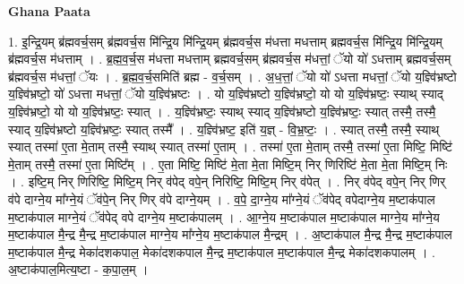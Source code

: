 \documentclass[17pt]{extarticle}
\begin{document}
\textbf{Ghana Paata } \newline

1. इ॒न्द्रि॒यम् ब्र॑ह्मवर्च॒सम् ब्र॑ह्मवर्च॒स मि॑न्द्रि॒य मि॑न्द्रि॒यम् ब्र॑ह्मवर्च॒स म॑धत्ता मधत्ताम् ब्रह्मवर्च॒स मि॑न्द्रि॒य मि॑न्द्रि॒यम् ब्र॑ह्मवर्च॒स म॑धत्ताम् । . ब्र॒ह्म॒व॒र्च॒स म॑धत्ता मधत्ताम् ब्रह्मवर्च॒सम् ब्र॑ह्मवर्च॒स म॑धत्तां॒ ॅयो यो॑ ऽधत्ताम् ब्रह्मवर्च॒सम् ब्र॑ह्मवर्च॒स म॑धत्तां॒ ॅयः । . ब्र॒ह्म॒व॒र्च॒समिति॑ ब्रह्म - व॒र्च॒सम् । . अ॒ध॒त्तां॒ ॅयो यो॑ ऽधत्ता मधत्तां॒ ॅयो य॒ज्ञ्वि॑भ्रष्टो य॒ज्ञ्वि॑भ्रष्टो॒ यो॑ ऽधत्ता मधत्तां॒ ॅयो य॒ज्ञ्वि॑भ्रष्टः । . यो य॒ज्ञ्वि॑भ्रष्टो य॒ज्ञ्वि॑भ्रष्टो॒ यो यो य॒ज्ञ्वि॑भ्रष्टः॒ स्याथ् स्याद् य॒ज्ञ्वि॑भ्रष्टो॒ यो यो य॒ज्ञ्वि॑भ्रष्टः॒ स्यात् । . य॒ज्ञ्वि॑भ्रष्टः॒ स्याथ् स्याद् य॒ज्ञ्वि॑भ्रष्टो य॒ज्ञ्वि॑भ्रष्टः॒ स्यात् तस्मै॒ तस्मै॒ स्याद् य॒ज्ञ्वि॑भ्रष्टो य॒ज्ञ्वि॑भ्रष्टः॒ स्यात् तस्मै᳚ । . य॒ज्ञ्वि॑भ्रष्ट॒ इति॑ य॒ज्ञ् - वि॒भ्र॒ष्टः॒ । . स्यात् तस्मै॒ तस्मै॒ स्याथ् स्यात् तस्मा॑ ए॒ता मे॒ताम् तस्मै॒ स्याथ् स्यात् तस्मा॑ ए॒ताम् । . तस्मा॑ ए॒ता मे॒ताम् तस्मै॒ तस्मा॑ ए॒ता मिष्टि॒ मिष्टि॑ मे॒ताम् तस्मै॒ तस्मा॑ ए॒ता मिष्टि᳚म् । . ए॒ता मिष्टि॒ मिष्टि॑ मे॒ता मे॒ता मिष्टि॒म् निर् णिरिष्टि॑ मे॒ता मे॒ता मिष्टि॒म् निः । . इष्टि॒म् निर् णिरिष्टि॒ मिष्टि॒म् निर् व॑पेद् वपे॒न् निरिष्टि॒ मिष्टि॒म् निर् व॑पेत् । . निर् व॑पेद् वपे॒न् निर् णिर् व॑पे दाग्ने॒य मा᳚ग्ने॒यं ॅव॑पे॒न् निर् णिर् व॑पे दाग्ने॒यम् । . व॒पे॒ दा॒ग्ने॒य मा᳚ग्ने॒यं ॅव॑पेद् वपेदाग्ने॒य म॒ष्टाक॑पाल म॒ष्टाक॑पाल माग्ने॒यं ॅव॑पेद् वपे दाग्ने॒य म॒ष्टाक॑पालम् । . आ॒ग्ने॒य म॒ष्टाक॑पाल म॒ष्टाक॑पाल माग्ने॒य मा᳚ग्ने॒य म॒ष्टाक॑पाल मै॒न्द्र मै॒न्द्र म॒ष्टाक॑पाल माग्ने॒य मा᳚ग्ने॒य म॒ष्टाक॑पाल मै॒न्द्रम् । . अ॒ष्टाक॑पाल मै॒न्द्र मै॒न्द्र म॒ष्टाक॑पाल म॒ष्टाक॑पाल मै॒न्द्र मेका॑दशकपाल॒ मेका॑दशकपाल मै॒न्द्र म॒ष्टाक॑पाल म॒ष्टाक॑पाल मै॒न्द्र मेका॑दशकपालम् । . अ॒ष्टाक॑पाल॒मित्य॒ष्टा - क॒पा॒ल॒म् । \newline
\end{document}
